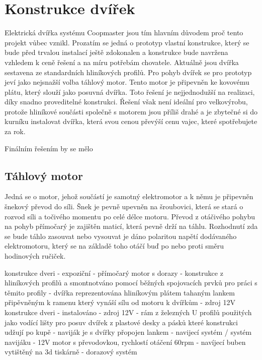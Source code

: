 \section{Konstrukce dvířek}\label{sec:konstrukce-dvirek}
Elektrická dvířka systému Coopmaster jsou tím hlavním důvodem proč tento projekt vůbec vznikl.
Prozatím se jedná o prototyp vlastní konstrukce, který se bude před trvalou instalací ještě zdokonalen a konstrukce bude navržena vzhledem k ceně řešení a na míru potřebám chovatele.
Aktuálně jsou dvířka sestavena ze standardních hliníkových profilů.
Pro pohyb dvířek se pro prototyp jeví jako nejsnažší volba táhlový motor.
Tento motor je připevněn ke kovovému plátu, který slouží jako posuvná dvířka.
Toto řešení je nejjednodužší na realizaci, díky snadno proveditelné konstrukci.
Řešení však není ideální pro velkovýrobu, protože hliníkové součásti společně s motorem jsou příliš drahé a je zbytečné si do kurníku instalovat dvířka, která svou cenou převýší cenu vajec, které spotřebujete za rok.

Finálním řešením by se mělo
\subsection*{Táhlový motor}
Jedná se o motor, jehož součástí je samotný elektromotor a k němu je připevněn šnekový převod do síli.
Šnek je pevně upevněn na šroubovici, která se stará o rozvod síli a točivého momentu po celé délce motoru.
Převod z otáčivého pohybu na pohyb přímočarý je zajištěn maticí, která pevně drží na táhlu.
Rozhodnutí zda se bude táhlo zasouvat nebo vysouvat je dáno polaritou napětí dodávaného elektromotoru, který se na základě toho otáčí buď po nebo proti směru hodinových ručiček.

konstrukce dveri - expoziční
- přímočarý motor s dorazy
- konstrukce z hliníkových profilů a smontnotváno pomocí běžných spojovacích prvků pro práci s těmito profily
- dvířka reprezentována hliníkovým plátem tahaným lankem připěvněným k ramenu který vynáší sílu od motoru k dvířkům
- zdroj 12V
konstrukce dveri - instalováno
- zdroj 12V
- rám z železných U profilů použitých jako vodící lišty pro posuv dvířek z plastové desky a pásků které konstrukci udžují po kupě
- naviják je s dvířky přopojen lankem
- navijecí systém / systém navijáku
- 12V motor s převodovkou, rychlostí otáčení 60rpm
- navíjecí buben vytištěný na 3d tiskárně
- dorazový systém